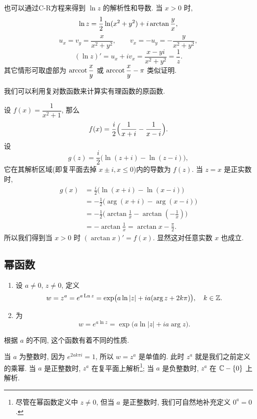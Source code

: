也可以通过C-R方程来得到 $\ln z$ 的解析性和导数.
当 $x>0$ 时,
\[
  \ln z=\frac{1}{2} \ln(x^2+y^2)+i\arctan \frac yx,
\]
\[
  u_x=v_y=\frac x{x^2+y^2},\qquad v_x=-u_y=-\frac y{x^2+y^2},
\]
\[
  (\ln z)'=u_x+iv_x=\frac{x-yi}{x^2+y^2}=\frac 1z.
\]
其它情形可取虚部为 $\operatorname{arccot}\dfrac xy$ 或 $\operatorname{arccot}\dfrac xy-\pi$ 类似证明.

我们可以利用复对数函数来计算实有理函数的原函数.

\begin{example}
  设 $f(x)=\dfrac1{x^2+1}$, 那么
  \[
    f(x)=\frac i2\Bigl(\frac1{x+i}-\frac1{x-i}\Bigr).
  \]
  设
  \[
    g(z)=\frac i2\bigl(\ln(z+i)-\ln(z-i)\bigr),
  \]
  它在其解析区域(即复平面去掉 $x\pm i,x\le 0$)内的导数为 $f(z)$.
  当 $z=x$ 是正实数时, 
  \begin{align*}
    g(x)&=\frac i2\bigl(\ln(x+i)-\ln(x-i)\bigr)\\
    &=-\frac12\bigl(\arg(x+i)-\arg(x-i)\bigr)\\
    &=-\frac12\bigl(\arctan \frac1x-\arctan(-\frac1x)\bigr)\\
    &=-\arctan \frac1x=\arctan x-\frac\pi2.
  \end{align*}
  所以我们得到当 $x>0$ 时 $(\arctan x)'=f(x)$.
  显然这对任意实数 $x$ 也成立.
\end{example}



\subsection{幂函数}

\begin{definition}
  \begin{enumerate}
    \item 设 $a\neq 0$, $z\neq 0$, 定义
      \[
        w=z^a=e^{a\operatorname{Ln} z}
        =\exp\bigl(a\ln|z|+ia(\arg z+2k\pi)\bigr),\quad k\in{\mathbb{Z}}.
      \]
    \item {}为
      \[
        w=e^{a\ln z}=\exp\bigl(a\ln|z|+ia\arg z\bigr).
      \]
  \end{enumerate}
\end{definition}

根据 $a$ 的不同, 这个函数有着不同的性质.

当 $a$ 为整数时, 因为 $e^{2ak\pi i}=1$, 所以 $w=z^a$ 是单值的. 此时 $z^a$ 就是我们之前定义的乘幂. 
当 $a$ 是正整数时, $z^a$ 在复平面上解析\footnote{%
  尽管在幂函数定义中 $z\neq 0$, 但当 $a$ 是正整数时, 我们可自然地补充定义 $0^a=0$.
};
当 $a$ 是负整数时, $z^a$ 在 ${\mathbb{C}}-{\left\{0\right\}}$ 上解析.

